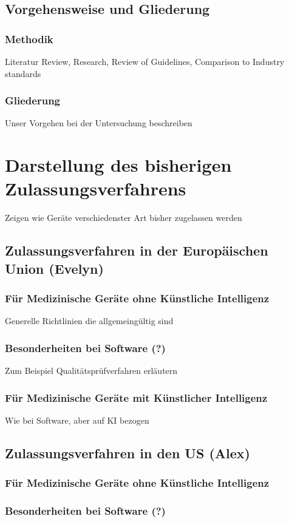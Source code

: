 \documentclass[a4paper, 12pt]{article}
\begin{document}
\subsection{Vorgehensweise und Gliederung}
\subsubsection{Methodik}
Literatur Review, Research, Review of Guidelines, Comparison to Industry standards
\subsubsection{Gliederung}
Unser Vorgehen bei der Untersuchung beschreiben


\section{Darstellung des bisherigen Zulassungsverfahrens}
Zeigen wie Geräte verschiedenster Art bisher zugelassen werden
\subsection{Zulassungsverfahren in der Europäischen Union (Evelyn)}
\subsubsection{Für Medizinische Geräte ohne Künstliche Intelligenz}
Generelle Richtlinien die allgemeingültig sind
\subsubsection{Besonderheiten bei Software (?)}
Zum Beispiel Qualitätsprüfverfahren erläutern
\subsubsection{Für Medizinische Geräte mit Künstlicher Intelligenz}
Wie bei Software, aber auf KI bezogen
\subsection{Zulassungsverfahren in den US (Alex)}
\subsubsection{Für Medizinische Geräte ohne Künstliche Intelligenz}
\subsubsection{Besonderheiten bei Software (?)}
\end{document}
